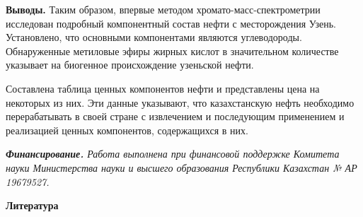 \begin{multicols}{2}
{\bfseries Выводы.} Таким образом, впервые методом
хромато-масс-спектрометрии исследован подробный компонентный состав
нефти с месторождения Узень. Установлено, что основными компонентами
являются углеводороды. Обнаруженные метиловые эфиры жирных кислот в
значительном количестве указывает на биогенное происхождение узеньской
нефти.

Составлена таблица ценных компонентов нефти и представлены цена на
некоторых из них. Эти данные указывают, что казахстанскую нефть
необходимо перерабатывать в своей стране с извлечением и последующим
применением и реализацией ценных компонентов, содержащихся в них.

\emph{{\bfseries Финансирование.} Работа выполнена при финансовой поддержке
Комитета науки Министерства науки и высшего образования Республики
Казахстан № АР 19679527.}
\end{multicols}

\begin{center}
{\bfseries Литература}
\end{center}

